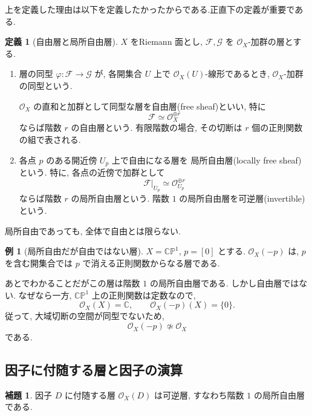 \documentclass[dvipdfmx,a4paper,11pt]{article} %
\newcommand{\C}{\mathbb{C}}
\theoremstyle{definition}
\numberwithin{equation}{section}
\newtheorem{lem}[thm]{補題}
\newtheorem{dfn}[thm]{定義}
\newtheorem{exa}[thm]{例}
\begin{document}
上を定義した理由は以下を定義したかったからである.正直下の定義が重要である. 
\begin{dfn}[自由層と局所自由層]
$X$ をRiemann 面とし, $\mathcal F,\mathcal G$ を
$\mathcal O_X$-加群の層とする.
\begin{enumerate}
\item

層の同型 $\varphi:\mathcal F\to\mathcal G$ が, 
各開集合 $U$ 上で $\mathcal O_X(U)$-線形であるとき, 
$\mathcal O_X$-加群の同型という.

$\mathcal O_X$ の直和と加群として同型な層を自由層(free sheaf)といい, 
特に
\[
\mathcal F\simeq\mathcal O_X^{\oplus r}
\]
ならば階数 $r$ の自由層という.
有限階数の場合, その切断は $r$ 個の正則関数の組で表される.

\item

各点 $p$ のある開近傍 $U_p$ 上で自由になる層を
局所自由層(locally free sheaf)という.
特に, 各点の近傍で加群として
\[
\mathcal F|_{U_p}\simeq\mathcal O_{U_p}^{\oplus r}
\]
ならば階数 $r$ の局所自由層という.
階数 $1$ の局所自由層を可逆層(invertible)という.
\end{enumerate}
\end{dfn}
局所自由であっても, 全体で自由とは限らない.
\begin{exa}[局所自由だが自由ではない層]\label{O-M207}
$X=\C\mathbb P^1$, $p=[0]$ とする.
$\mathcal O_X(-p)$ は, $p$ を含む開集合では
$p$ で消える正則関数からなる層である.

あとでわかることだがこの層は階数 $1$ の局所自由層である. 
しかし自由層ではない.
なぜなら一方, $\C\mathbb P^1$ 上の正則関数は定数なので, 
\[
\mathcal O_X(X)=\C,\qquad
\mathcal O_X(-p)(X)=\{0\}.
\]
従って, 大域切断の空間が同型でないため, 
\[
\mathcal O_X(-p)\not\simeq\mathcal O_X
\]
である.
\end{exa}


\subsection{因子に付随する層と因子の演算}\label{O-S036}
\begin{lem}\label{O-M205}
因子 $D$ に付随する層 $\mathcal O_X(D)$ は可逆層, 
すなわち階数 $1$ の局所自由層である.
\end{lem}
\end{document}
